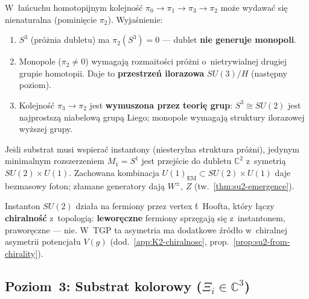 \begin{remark}%
\label{rem:D2-pi3-before-pi2}
W~\l{}a\'ncuchu homotopijnym kolejno\'s\'c $\pi_0 \to \pi_1
\to \pi_3 \to \pi_2$ mo\.ze wydawa\'c si\k{e} nienaturalna
(pomini\k{e}cie $\pi_2$). Wyja\'snienie:

\begin{enumerate}[nosep]
  \item $S^3$ (pr\'o\.znia dubletu) ma $\pi_2(S^3) = 0$ ---
    dublet \textbf{nie generuje monopoli}.
  \item Monopole ($\pi_2 \neq 0$) wymagaj\k{a} rozmaito\'sci
    pr\'o\.zni o~nietrywialnej drugiej grupie homotopii.
    Daje to \textbf{przestrze\'n ilorazowa} $SU(3)/H$
    (nast\k{e}pny poziom).
  \item Kolejno\'s\'c $\pi_3 \to \pi_2$ jest \textbf{wymuszona
    przez teori\k{e} grup}: $S^3 \cong SU(2)$ jest najprostsz\k{a}
    niabelow\k{a} grup\k{a} Liego; monopole wymagaj\k{a}
    struktury ilorazowej wy\.zszej grupy.
\end{enumerate}
\end{remark}

\begin{corollary}\label{cor:D2-SU2-forced}
Je\.sli substrat musi wspiera\'c instantony (niesterylna
struktura pr\'o\.zni), jedynym minimalnym rozszerzeniem
$M_1 = S^1$ jest przej\'scie do dubletu $\mathbb{C}^2$
z~symetri\k{a} $SU(2) \times U(1)$.
Zachowana kombinacja $U(1)_{\mathrm{EM}} \subset SU(2) \times U(1)$
daje bezmasowy foton; z\l{}amane generatory daj\k{a}
$W^\pm$, $Z$ (tw.~\ref{thm:su2-emergence}).
\end{corollary}

\begin{remark}[Chiralno\'s\'c z~$\pi_3(S^3) = \mathbb{Z}$]%
\label{rem:D2-chirality}
Instanton $SU(2)$ dzia\l{}a na fermiony przez
vertex \'t~Hoofta, kt\'ory \l{}\k{a}czy \textbf{chiralno\'s\'c}
z~topologi\k{a}: \textbf{lewor\k{e}czne} fermiony sprz\k{e}gaj\k{a}
si\k{e} z~instantonem, prawor\k{e}czne --- nie.
W~TGP ta asymetria ma dodatkowe \'zr\'od\l{}o w~chiralnej
asymetrii potencja\l{}u $V(g)$ (dod.~\ref{app:K2-chiralnosc},
prop.~\ref{prop:su2-from-chirality}).
\end{remark}

\subsection{Poziom~3: Substrat kolorowy ($\Xi_i \in \mathbb{C}^3$)}%
\label{ssec:D2-level3}


